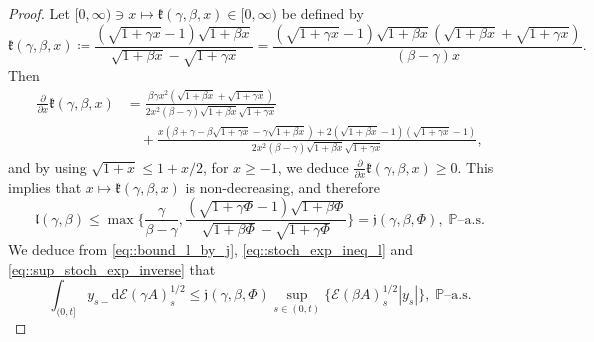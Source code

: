 \documentclass[10pt]{article} %
\newcommand\cE{\mathcal E}
\def \P{\mathbb{P}}
\newcommand{\1}{\mathbf{1}}
\def\d{\mathrm{d}}
\begin{document}
\begin{proof}
	Let $[0,\infty) \ni x \longmapsto \mathfrak{k}(\gamma,\beta,x) \in [0,\infty)$ be defined by
	\begin{equation*}
		\mathfrak{k}(\gamma,\beta,x) \coloneqq  \frac{(\sqrt{1+\gamma x} - 1)\sqrt{1+\beta x}}{\sqrt{1+\beta x} - \sqrt{1+\gamma x}} = \frac{(\sqrt{1+\gamma x} - 1)\sqrt{1+\beta x}(\sqrt{1+\beta x} + \sqrt{1+\gamma x})}{(\beta-\gamma)x}.
	\end{equation*}
	Then
	\begin{align*}
		\frac{\partial}{\partial x} \mathfrak{k}(\gamma,\beta,x) 
		&= \frac{\beta  \gamma  x^2 (\sqrt{1+\beta x}+\sqrt{1+\gamma x})}{2 x^2 (\beta -\gamma ) \sqrt{1+\beta x} \sqrt{1+\gamma x}} \\
		&\quad +\frac{x (\beta +\gamma -\beta\sqrt{1+\gamma x}-\gamma  \sqrt{1+\beta x})+2 (\sqrt{1+\beta x}-1) (\sqrt{1+\gamma x}-1)}{2 x^2 (\beta -\gamma ) \sqrt{1+\beta x} \sqrt{1+\gamma x}},
	\end{align*}
	and by using $\sqrt{1+x} \leq 1+x/2$, for $x \geq -1$, we deduce $\frac{\partial}{\partial x} \mathfrak{k}(\gamma,\beta,x) \geq 0$. This implies that $x \longmapsto \mathfrak{k}(\gamma,\beta,x)$ is non-decreasing, and therefore
	\begin{equation}\label{eq::bound_l_by_j}
		\mathfrak{l}(\gamma,\beta) 
		\leq \max\bigg\{ \frac{\gamma}{\beta-\gamma}, \frac{(\sqrt{1+\gamma \Phi} - 1)\sqrt{1+\beta \Phi}}{\sqrt{1+\beta \Phi} - \sqrt{1+\gamma \Phi}} \bigg\} = \mathfrak{j}(\gamma,\beta,\Phi), \; \text{$\P$--a.s.}
	\end{equation}
	We deduce from \eqref{eq::bound_l_by_j}, \eqref{eq::stoch_exp_ineq_l} and \eqref{eq::sup_stoch_exp_inverse} that 
	\begin{equation}\label{eq::ineq_int_y_minus_stoch_exp}
		\int_{(0,t]}y_{s-}\d\cE(\gamma A)^{1/2}_s \leq \mathfrak{j}(\gamma,\beta,\Phi) \sup_{s \in (0,t)}\big\{\cE(\beta A)^{1/2}_{s}|y_{s}|\big\}, \; \text{$\P$--a.s.}
	\end{equation}
	

\end{proof}
\end{document}
